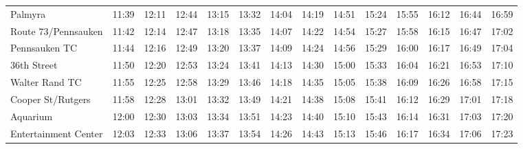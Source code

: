 \begin{center}
\begin{tabular}{@{}lrrrrrrrrrrrrr@{}}
Palmyra & 11:39 & 12:11 & 12:44 & 13:15 & 13:32 & 14:04 & 14:19 & 14:51 & 15:24 & 15:55 & 16:12 & 16:44 & 16:59 \\
Route 73/Pennsauken & 11:42 & 12:14 & 12:47 & 13:18 & 13:35 & 14:07 & 14:22 & 14:54 & 15:27 & 15:58 & 16:15 & 16:47 & 17:02 \\
Pennsauken TC & 11:44 & 12:16 & 12:49 & 13:20 & 13:37 & 14:09 & 14:24 & 14:56 & 15:29 & 16:00 & 16:17 & 16:49 & 17:04 \\
36th Street & 11:50 & 12:20 & 12:53 & 13:24 & 13:41 & 14:13 & 14:30 & 15:00 & 15:33 & 16:04 & 16:21 & 16:53 & 17:10 \\
Walter Rand TC & 11:55 & 12:25 & 12:58 & 13:29 & 13:46 & 14:18 & 14:35 & 15:05 & 15:38 & 16:09 & 16:26 & 16:58 & 17:15 \\
Cooper St/Rutgers & 11:58 & 12:28 & 13:01 & 13:32 & 13:49 & 14:21 & 14:38 & 15:08 & 15:41 & 16:12 & 16:29 & 17:01 & 17:18 \\
Aquarium & 12:00 & 12:30 & 13:03 & 13:34 & 13:51 & 14:23 & 14:40 & 15:10 & 15:43 & 16:14 & 16:31 & 17:03 & 17:20 \\
Entertainment Center & 12:03 & 12:33 & 13:06 & 13:37 & 13:54 & 14:26 & 14:43 & 15:13 & 15:46 & 16:17 & 16:34 & 17:06 & 17:23 \\
\bottomrule\end{tabular}\end{center}
